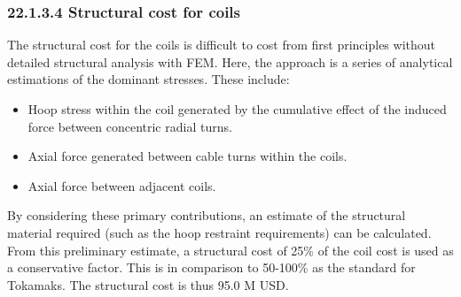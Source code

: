 \subsubsection*{22.1.3.4 Structural cost for coils}

The structural cost for the coils is difficult to cost from first principles without detailed structural analysis with FEM. Here, the approach is a series of analytical estimations of the dominant stresses. These include:

\begin{itemize}
    \item Hoop stress within the coil generated by the cumulative effect of the induced force between concentric radial turns.
    \item Axial force generated between cable turns within the coils. 
    \item Axial force between adjacent coils.
\end{itemize}


By considering these primary contributions, an estimate of the structural material required (such as the hoop restraint requirements) can be calculated. From this preliminary estimate, a structural cost of 25\% of the coil cost is used as a conservative factor. This is in comparison to 50-100\% as the standard for Tokamaks. The structural cost is thus 95.0 M USD.


